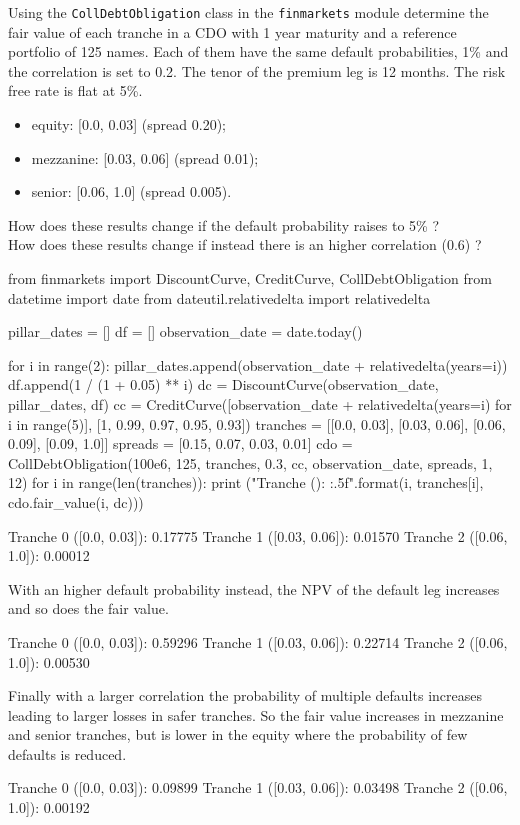 \begin{question}
Using the \texttt{CollDebtObligation} class in the \texttt{finmarkets} module determine the fair value of each tranche in a CDO with 1 year maturity and a reference portfolio of 125 names. Each of them have the same default probabilities, 1\% and the correlation is set to 0.2. The tenor of the premium leg is 12 months. The risk free rate is flat at 5\%.
\begin{itemize}
	\item equity: [0.0, 0.03] (spread 0.20);
	\item mezzanine: [0.03, 0.06] (spread 0.01);
	\item senior: [0.06, 1.0] (spread 0.005).
\end{itemize}
How does these results change if the default probability raises to 5\% ? \\
How does these results change if instead there is an higher correlation (0.6) ?
\end{question}

\cprotEnv\begin{solution}

\begin{ipython}
from finmarkets import DiscountCurve, CreditCurve, CollDebtObligation
from datetime import date
from dateutil.relativedelta import relativedelta

pillar_dates = []
df = []
observation_date = date.today()

for i in range(2):
    pillar_dates.append(observation_date + relativedelta(years=i))
    df.append(1 / (1 + 0.05) ** i)
    dc = DiscountCurve(observation_date, pillar_dates, df)
cc = CreditCurve([observation_date + relativedelta(years=i) for i in range(5)],
    [1, 0.99, 0.97, 0.95, 0.93])
tranches = [[0.0, 0.03], [0.03, 0.06], [0.06, 0.09], [0.09, 1.0]]
spreads = [0.15, 0.07, 0.03, 0.01]
cdo = CollDebtObligation(100e6, 125, tranches, 0.3, cc,
    observation_date, spreads, 1, 12)
for i in range(len(tranches)):
    print ("Tranche {} ({}): {:.5f}".format(i, tranches[i], cdo.fair_value(i, dc)))

Tranche 0 ([0.0, 0.03]): 0.17775
Tranche 1 ([0.03, 0.06]): 0.01570
Tranche 2 ([0.06, 1.0]): 0.00012
\end{ipython}
With an higher default probability instead, the NPV of the default leg increases and so does the fair value.

\begin{ipython}
Tranche 0 ([0.0, 0.03]): 0.59296
Tranche 1 ([0.03, 0.06]): 0.22714
Tranche 2 ([0.06, 1.0]): 0.00530
\end{ipython}
Finally with a larger correlation the probability of multiple defaults increases leading to larger losses in safer tranches. So the fair value increases in mezzanine and senior tranches, but is lower in the equity where the probability of few defaults is reduced.

\begin{ipython}
Tranche 0 ([0.0, 0.03]): 0.09899
Tranche 1 ([0.03, 0.06]): 0.03498
Tranche 2 ([0.06, 1.0]): 0.00192
\end{ipython}
\end{solution}
